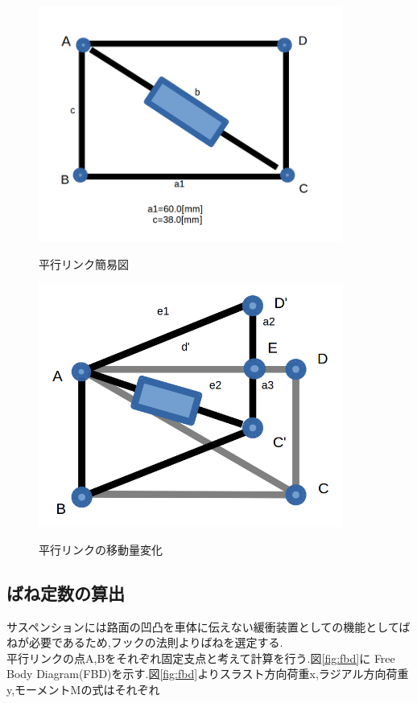 \documentclass[12pt,oneside]{sotsuken_paper}
\begin{document}
\begin{figure}[htp] 
 \begin{center} 
  \includegraphics[width=100mm]{img/hard/fig5.png} 
 　\caption{平行リンク簡易図} 
  \label{fig:bix}%
 \end{center} 
\end{figure} 


\begin{figure}[htp] 
 \begin{center} 
  \includegraphics[width=100mm]{img/hard/fig6.png} 
 　\caption{平行リンクの移動量変化} 
  \label{fig:rink}%
 \end{center} 
\end{figure} 

\subsection{ばね定数の算出} 
サスペンションには路面の凹凸を車体に伝えない緩衝装置としての機能としてばねが必要であるため,フックの法則よりばねを選定する.　\\ 
平行リンクの点A,Bをそれぞれ固定支点と考えて計算を行う.図\ref{fig:fbd}に Free Body Diagram(FBD)を示す.図\ref{fig:fbd}よりスラスト方向荷重x,ラジアル方向荷重y,モーメントMの式はそれぞれ 
\end{document}

